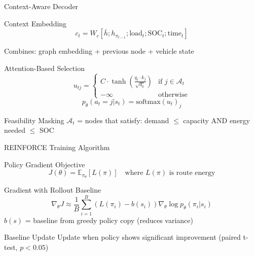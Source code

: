 \documentclass[aspectratio=169,11pt]{beamer}
\begin{document}
\begin{frame}{Context-Aware Decoder}
    \begin{block}{Context Embedding}
        \[
        c_t = W_c \left[\bar{h}; h_{\pi_{t-1}}; \text{load}_t; \text{SOC}_t; \text{time}_t\right]
        \]
        
        Combines: graph embedding + previous node + vehicle state
    \end{block}
    
    \begin{block}{Attention-Based Selection}
        \[
        u_{tj} = \begin{cases}
            C \cdot \tanh\left(\frac{q_t \cdot k_j}{\sqrt{d_k}}\right) & \text{if } j \in \mathcal{A}_t \\
            -\infty & \text{otherwise}
        \end{cases}
        \]
        \[
        p_\theta(a_t = j | s_t) = \text{softmax}(u_t)_j
        \]
    \end{block}
    
    \begin{exampleblock}{Feasibility Masking}
        $\mathcal{A}_t$ = nodes that satisfy: demand $\leq$ capacity AND energy needed $\leq$ SOC
    \end{exampleblock}
\end{frame}

\begin{frame}{REINFORCE Training Algorithm}
    \begin{block}{Policy Gradient Objective}
        \vspace{-0.2cm}
        \[
        J(\theta) = \mathbb{E}_{\pi_\theta}\left[L(\pi)\right] \quad \text{where } L(\pi) \text{ is route energy}
        \]
        \vspace{-0.3cm}
    \end{block}

    \begin{block}{Gradient with Rollout Baseline}
        \vspace{-0.2cm}
        \[
        \nabla_\theta J \approx \frac{1}{B}\sum_{i=1}^{B} \left(L(\pi_i) - b(s_i)\right) \nabla_\theta \log p_\theta(\pi_i | s_i)
        \]
        \vspace{-0.2cm}
        \small $b(s)$ = baseline from greedy policy copy (reduces variance)
    \end{block}

    \begin{exampleblock}{Baseline Update}
        Update when policy shows significant improvement (paired t-test, $p < 0.05$)
    \end{exampleblock}
\end{frame}
\end{document}
